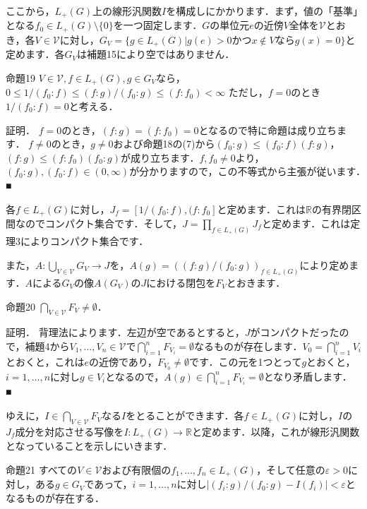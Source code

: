 ここから，$L_{+}(G)$上の線形汎関数$I$を構成しにかかります．まず，値の「基準」となる$f_{0} \in L_{+}(G) \setminus \{ 0 \}$を一つ固定します．$G$の単位元$e$の近傍$V$全体を$\mathscr{V}$とおき，各$V \in \mathscr{V}$に対し，$G_{V}=\{ g \in L_{+}(G) | g(e)>0 かつ x \not\in V ならg(x)=0 \}$と定めます．各$G_V$は補題15により空ではありません．

命題19
$V \in \mathscr{V}, f \in L_{+}(G), g \in G_{V}$なら，$0 \le 1/( f_0 \colon f ) \le ( f \colon g ) / ( f_0 \colon g ) \le ( f \colon f_0 ) < \infty$
ただし，$f=0$のとき$1/( f_0 \colon f ) = 0$と考える．

証明．
$f=0$のとき，$( f \colon g ) = ( f \colon f_0 ) = 0$となるので特に命題は成り立ちます．
$f \ne 0$のとき，$g \neq 0$および命題18の(7)から$(f_0 \colon g) \le (f_0 \colon f) (f \colon g )$，$ (f \colon g) \le (f \colon f_0 ) (f_0 \colon g )$が成り立ちます．$f, f_0 \neq 0$より，$(f_0 \colon g), (f_0 \colon f) \in (0, \infty)$が分かりますので，この不等式から主張が従います．　■

各$f \in L_{+}(G)$に対し，$J_{f}=[1/ ( f_0 \colon f ) , ( f \colon f_{0} ]$と定めます．これは$\mathbb{R}$の有界閉区間なのでコンパクト集合です．そして，$J=\prod_{f \in L_{+}(G)} J_f$と定めます．これは定理3によりコンパクト集合です．

また，$A \colon \bigcup_{V \in \mathscr{V}}G_V \to J$を，$A(g)=( ( f \colon g ) / ( f_0 \colon g ) )_{f \in L_{+}(G)}$により定めます．$A$による$G_V$の像$A(G_V)$の$J$における閉包を$F_V$とおきます．

命題20
$\bigcap_{V \in \mathscr{V}}F_V \neq \emptyset$．

証明．
背理法によります．左辺が空であるとすると，$J$がコンパクトだったので，補題4から$V_1, \ldots , V_n \in \mathscr{V}$で$\bigcap_{i=1}^{n}F_{V_i}=\emptyset$なるものが存在します．$V_0=\bigcap_{i=1}^{n}V_i$とおくと，これは$e$の近傍であり，$F_{V_0} \neq \emptyset$です．この元を1つとって$g$とおくと，$i=1, \ldots , n$に対し$g \in V_i$となるので，$A(g) \in \bigcap_{i=1}^{n}F_{V_i}=\emptyset$となり矛盾します．　■

ゆえに，$I \in \bigcap_{V \in \mathscr{V}}F_V$なる$I$をとることができます．各$f \in L_{+}(G)$に対し，$I$の$J_f$成分を対応させる写像を$I \colon L_{+}(G) \to \mathbb{R}$と定めます．以降，これが線形汎関数となっていることを示しにいきます．

命題21
すべての$V \in \mathscr{V}$および有限個の$f_1, \ldots , f_n \in L_{+}(G)$，そして任意の$\varepsilon > 0$に対し，ある$g \in G_V$であって，$i=1, \ldots , n$に対し$|(f_i \colon g ) / ( f_0 \colon g ) -I(f_i) | < \varepsilon$となるものが存在する．

